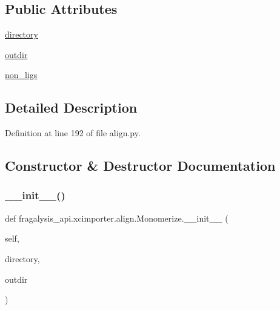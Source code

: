 \subsection*{Public Attributes}
\begin{DoxyCompactItemize}
\item 
\hyperlink{classfragalysis__api_1_1xcimporter_1_1align_1_1_monomerize_a20636604f47438298d2420ce35297281}{directory}
\item 
\hyperlink{classfragalysis__api_1_1xcimporter_1_1align_1_1_monomerize_a7d47cce7a11f51abbfc8b246b42f5181}{outdir}
\item 
\hyperlink{classfragalysis__api_1_1xcimporter_1_1align_1_1_monomerize_ad165d10ed4bed3d12660094bcd82ea62}{non\+\_\+ligs}
\end{DoxyCompactItemize}


\subsection{Detailed Description}


Definition at line 192 of file align.\+py.



\subsection{Constructor \& Destructor Documentation}
\mbox{\label{classfragalysis__api_1_1xcimporter_1_1align_1_1_monomerize_ab3b407ab1e80bd20413390da2e92bc45}} 
\subsubsection{\texorpdfstring{\+\_\+\+\_\+init\+\_\+\+\_\+()}{\_\_init\_\_()}}
{\footnotesize\ttfamily def fragalysis\+\_\+api.\+xcimporter.\+align.\+Monomerize.\+\_\+\+\_\+init\+\_\+\+\_\+ (\begin{DoxyParamCaption}\item[{}]{self,  }\item[{}]{directory,  }\item[{}]{outdir }\end{DoxyParamCaption})}



